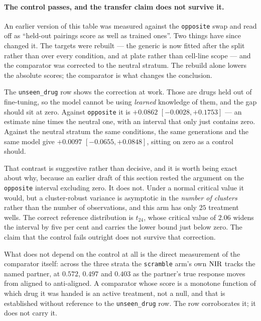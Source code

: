 \paragraph{The control passes, and the transfer claim does not survive it.} An earlier version of
this table was measured against the \texttt{opposite} swap and read off as ``held-out pairings score
as well as trained ones''. Two things have since changed it. The targets were rebuilt --- the generic
is now fitted after the split rather than over every condition, and at plate rather than cell-line
scope --- and the comparator was corrected to the neutral stratum. The rebuild alone lowers the
absolute scores; the comparator is what changes the conclusion. 

The \texttt{unseen\_drug} row shows the correction at work. Those are drugs held out of
fine-tuning, so the model cannot be using \emph{learned} knowledge of them, and the gap should sit at
zero. Against \texttt{opposite} it is $+0.0862$ \nolinebreak[3]$[-0.0028, +0.1753]$ --- an estimate
nine times the neutral one, with an interval that only just contains zero. Against the neutral
stratum the same conditions, the same generations and the same model give $+0.0097$
\nolinebreak[3]$[-0.0655, +0.0848]$, sitting on zero as a control should.

That contrast is suggestive rather than decisive, and it is worth being exact about why, because an
earlier draft of this section rested the argument on the \texttt{opposite} interval excluding zero.
It does not. Under a normal critical value it would, but a cluster-robust variance is asymptotic in
the \emph{number of clusters} rather than the number of observations, and this arm has only $25$
treatment wells. The correct reference distribution is $t_{24}$, whose critical value of $2.06$
widens the interval by five per cent and carries the lower bound just below zero. The claim that the
control fails outright does not survive that correction.

What does not depend on the control at all is the direct measurement of the comparator itself: across
the three strata the \texttt{scramble} arm's own $\textrm{NIR}$ tracks the named partner, at $0.572$,
$0.497$ and $0.403$ as the partner's true response moves from aligned to anti-aligned. A comparator
whose score is a monotone function of which drug it was handed is an active treatment, not a null,
and that is established without reference to the \texttt{unseen\_drug} row. The row corroborates it;
it does not carry it.

